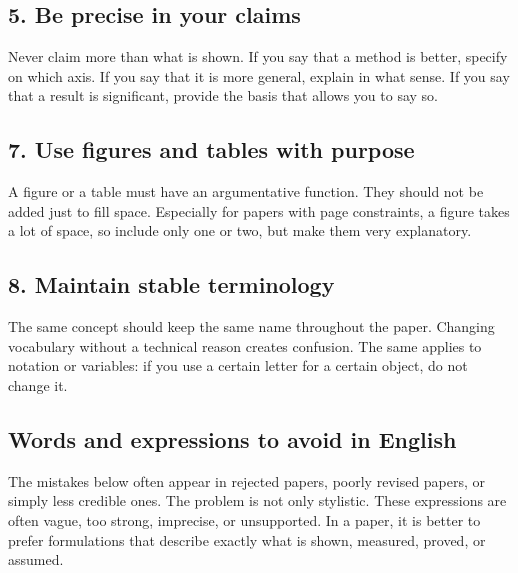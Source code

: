 \documentclass[11pt,a4paper]{article}
\theoremstyle{definition}
\begin{document}
\subsection*{5. Be precise in your claims}

Never claim more than what is shown. If you say that a method is better, specify on which axis. If you say that it is more general, explain in what sense. If you say that a result is significant, provide the basis that allows you to say so.

\subsection*{7. Use figures and tables with purpose}

A figure or a table must have an argumentative function. They should not be added just to fill space. Especially for papers with page constraints, a figure takes a lot of space, so include only one or two, but make them very explanatory.

\subsection*{8. Maintain stable terminology}

The same concept should keep the same name throughout the paper. Changing vocabulary without a technical reason creates confusion. The same applies to notation or variables: if you use a certain letter for a certain object, do not change it.

\subsection*{Words and expressions to avoid in English}

The mistakes below often appear in rejected papers, poorly revised papers, or simply less credible ones.
The problem is not only stylistic. These expressions are often vague, too strong,
imprecise, or unsupported. In a paper, it is better to prefer formulations that describe
exactly what is shown, measured, proved, or assumed.
\end{document}
